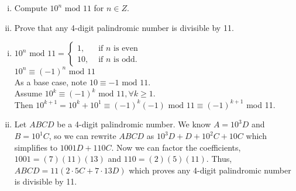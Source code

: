 \documentclass[11pt]{article}
\newenvironment{solution}{\begin{mdframed}[skipabove=\baselineskip,innertopmargin=\baselineskip,innerbottommargin=\baselineskip]
  }{\end{mdframed}}
\begin{document}
\begin{enumerate}[(i)] 
\item Compute $10^n \text{ mod } 11$ for $n\in Z$. %
\item Prove that any 4-digit palindromic number is divisible by 11. %
\end{enumerate}

\begin{solution}
\begin{enumerate}[(i)]
    \item $	10^n  \text{ mod } 11 = 
    	\begin{cases} 
    	1, & \text{ if $n$ is even }\\
    	10, & \text{ if $n$ is odd. } 
    	\end{cases} $ \vspace{1em} \\
    	$10^n \equiv (-1)^n \text{ mod } 11$ \\
    	As a base case, note $10 \equiv -1 \text{ mod } 11$. \\
    	Assume $10^k \equiv (-1)^k \text{ mod } 11, \forall k \geq 1$. \\
    	Then $10^{k+1} = 10^k + 10^1 \equiv (-1)^k(-1)\text{ mod }11 \equiv (-1)^{k+1}$ mod 11.
    	
    \item Let $ABCD$ be a 4-digit palindromic number. We know $A=10^3D$ and $B=10^1C$, so we can rewrite $ABCD$ as $10^3D+D+10^2C+10C$ which simplifies to $1001D+110C$. Now we can factor the coefficients, $1001 = (7)(11)(13)$ and $110 = (2)(5)(11)$. Thus, $ABCD = 11(2\cdot5C + 7\cdot13D)$ which proves any 4-digit palindromic number is divisible by 11.
\end{enumerate}
\end{solution}

\end{document}
